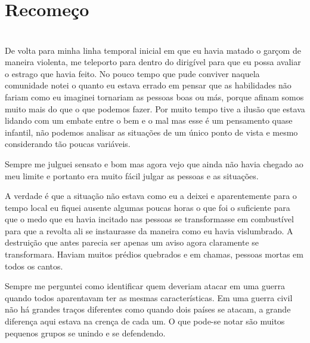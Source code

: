 


\newpage


\ifdefined\useChapters
\chapter{Recomeço}

\else
\chapter{}
\fi

De volta para minha linha temporal  inicial em que eu havia matado o garçom de maneira violenta, me teleporto para dentro do dirigível para que eu possa avaliar o estrago que havia feito. No pouco tempo que pude conviver naquela comunidade notei o quanto eu estava errado em pensar que as habilidades não fariam como eu imaginei tornariam as pessoas boas ou más, porque afinam somos muito mais do que o que podemos fazer. Por muito tempo tive a ilusão que estava lidando com um embate entre o bem e o mal mas esse é um pensamento quase infantil, não podemos analisar as situações de um único ponto de vista e mesmo considerando tão poucas variáveis.
 
Sempre me julguei sensato e bom mas agora vejo que ainda não havia chegado ao meu limite e portanto era muito fácil julgar as pessoas e as situações. 

A verdade é que a situação não estava como eu a deixei e aparentemente para o tempo local eu fiquei ausente algumas poucas horas o que foi o suficiente para que o medo que eu havia incitado nas pessoas se transformasse em combustível para que a revolta ali se instaurasse da maneira como eu havia vislumbrado. A destruição que antes parecia ser apenas um aviso agora claramente se transformara.  Haviam muitos prédios quebrados e em chamas, pessoas mortas em todos os cantos.

Sempre me perguntei como identificar quem deveriam atacar em uma guerra quando todos aparentavam ter as mesmas características. Em uma guerra civil não há grandes traços diferentes como quando dois países se atacam, a grande diferença aqui estava na crença de cada um. O que pode-se notar são muitos pequenos grupos se unindo e se defendendo.

